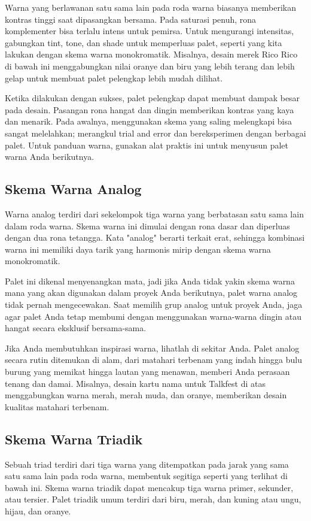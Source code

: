 \documentclass[a4paper]{article}
\begin{document}
Warna yang berlawanan satu sama lain pada roda warna biasanya memberikan kontras tinggi saat dipasangkan bersama. Pada saturasi penuh, rona komplementer bisa terlalu intens untuk pemirsa. Untuk mengurangi intensitas, gabungkan tint, tone, dan shade untuk memperluas palet, seperti yang kita lakukan dengan skema warna monokromatik. Misalnya, desain merek Rico Rico di bawah ini menggabungkan nilai oranye dan biru yang lebih terang dan lebih gelap untuk membuat palet pelengkap lebih mudah dilihat.

Ketika dilakukan dengan sukses, palet pelengkap dapat membuat dampak besar pada desain. Pasangan rona hangat dan dingin memberikan kontras yang kaya dan menarik. Pada awalnya, menggunakan skema yang saling melengkapi bisa sangat melelahkan; merangkul trial and error dan bereksperimen dengan berbagai palet. Untuk panduan warna, gunakan alat praktis ini untuk menyusun palet warna Anda berikutnya.
\subsection{Skema Warna Analog}
Warna analog terdiri dari sekelompok tiga warna yang berbatasan satu sama lain dalam roda warna. Skema warna ini dimulai dengan rona dasar dan diperluas dengan dua rona tetangga. Kata "analog" berarti terkait erat, sehingga kombinasi warna ini memiliki daya tarik yang harmonis mirip dengan skema warna monokromatik.

Palet ini dikenal menyenangkan mata, jadi jika Anda tidak yakin skema warna mana yang akan digunakan dalam proyek Anda berikutnya, palet warna analog tidak pernah mengecewakan. Saat memilih grup analog untuk proyek Anda, jaga agar palet Anda tetap membumi dengan menggunakan warna-warna dingin atau hangat secara eksklusif bersama-sama.

Jika Anda membutuhkan inspirasi warna, lihatlah di sekitar Anda. Palet analog secara rutin ditemukan di alam, dari matahari terbenam yang indah hingga bulu burung yang memikat hingga lautan yang menawan, memberi Anda perasaan tenang dan damai. Misalnya, desain kartu nama untuk Talkfest di atas menggabungkan warna merah, merah muda, dan oranye, memberikan desain kualitas matahari terbenam.

\subsection{Skema Warna Triadik}

Sebuah triad terdiri dari tiga warna yang ditempatkan pada jarak yang sama satu sama lain pada roda warna, membentuk segitiga seperti yang terlihat di bawah ini. Skema warna triadik dapat mencakup tiga warna primer, sekunder, atau tersier. Palet triadik umum terdiri dari biru, merah, dan kuning atau ungu, hijau, dan oranye.
\end{document}
